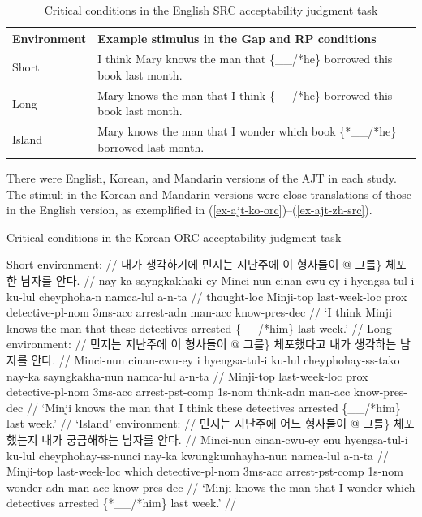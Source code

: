 \begin{table}
\caption{Critical conditions in the English SRC acceptability judgment task}\label{tab:ajt-cond-src}
\raggedright{}
\begin{tabularx}{\linewidth}{lL}\toprule
Environment & Example stimulus in the Gap and RP conditions \\\midrule
Short & I think Mary knows the man that \{\_\_/*he\} borrowed this book last month. \\
Long & Mary knows the man that I think \{\_\_/*he\} borrowed this book last month. \\
Island & Mary knows the man that I wonder which book \{*\_\_/*he\} borrowed last month. \\\bottomrule
\end{tabularx}
\vspace{-12pt}
\end{table}

There were English, Korean, and Mandarin versions of the AJT in each study. The stimuli in the Korean and Mandarin versions were close translations of those in the English version, as exemplified in (\ref{ex-ajt-ko-orc})--(\ref{ex-ajt-zh-src}). 

\pex[everygla=\ko]
Critical conditions in the Korean ORC acceptability judgment task \label{ex-ajt-ko-orc}\par\nobreak
\a 
\begingl
\glpreamble Short environment: //
\gla 내가 생각하기에 민지는 지난주에 이 형사들이 \nogloss{\{\_\_/*} @ 그를\} 체포한 남자를 안다. // 
\glb nay-ka sayngkakhaki-ey Minci-nun cinan-cwu-ey i hyengsa-tul-i ku-lul cheyphoha-n namca-lul a-n-ta //
 thought-{\sc loc} Minji-{\sc top} last-week-{\sc loc} {\sc prox} detective-{\sc pl-nom} {\sc 3ms-acc} arrest-{\sc adn} man-{\sc acc} know-{\sc pres-dec} //
\glft `I think Minji knows the man that these detectives arrested \{\_\_/*him\} last week.' // 
\endgl 
\a 
\begingl
\glpreamble Long environment: //
\gla 민지는 지난주에 이 형사들이 \nogloss{\{\_\_/*} @ 그를\} 체포했다고 내가 생각하는 남자를 안다. // 
\glb Minci-nun cinan-cwu-ey i hyengsa-tul-i ku-lul cheyphohay-ss-tako nay-ka sayngkakha-nun namca-lul a-n-ta //
\glc Minji-{\sc top} last-week-{\sc loc} {\sc prox} detective-{\sc pl-nom}  {\sc 3ms-acc} arrest-{\sc pst-comp} {\sc 1s-nom} think-{\sc adn} man-{\sc acc} know-{\sc pres-dec} //
\glft `Minji knows the man that I think these detectives arrested \{\_\_/*him\} last week.' // 
\endgl 
\a 
\begingl
\glpreamble `Island' environment: //
\gla 민지는 지난주에 어느 형사들이 \nogloss{\{\_\_/*} @ 그를\} 체포했는지 내가 궁금해하는 남자를 안다. // 
\glb Minci-nun cinan-cwu-ey enu hyengsa-tul-i ku-lul cheyphohay-ss-nunci nay-ka kwungkumhayha-nun namca-lul a-n-ta //
\glc Minji-{\sc top} last-week-{\sc loc} which detective-{\sc pl-nom}  {\sc 3ms-acc} arrest-{\sc pst-comp} {\sc 1s-nom} wonder-{\sc adn} man-{\sc acc} know-{\sc pres-dec} //
\glft `Minji knows the man that I wonder which detectives arrested \{*\_\_/*him\} last week.' //
\endgl 
\xe

